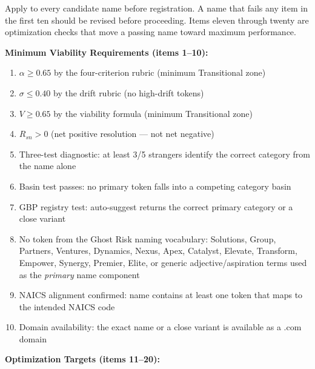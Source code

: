 \documentclass[12pt, openany]{book}
\theoremstyle{thmstyle}
\theoremstyle{defstyle}
\begin{document}
\begin{keybox}
Apply to every candidate name before registration. A name that fails any item in the first ten should be revised before proceeding. Items eleven through twenty are optimization checks that move a passing name toward maximum performance.

\vspace{6pt}
\textbf{Minimum Viability Requirements (items 1--10):}

\begin{enumerate}[leftmargin=1.5em, topsep=2pt]
  \item $\alpha \geq 0.65$ by the four-criterion rubric (minimum Transitional zone)
  \item $\sigma \leq 0.40$ by the drift rubric (no high-drift tokens)
  \item $V \geq 0.65$ by the viability formula (minimum Transitional zone)
  \item $R_{sn} > 0$ (net positive resolution --- not net negative)
  \item Three-test diagnostic: at least 3/5 strangers identify the correct category from the name alone
  \item Basin test passes: no primary token falls into a competing category basin
  \item GBP registry test: auto-suggest returns the correct primary category or a close variant
  \item No token from the Ghost Risk naming vocabulary: Solutions, Group, Partners, Ventures, Dynamics, Nexus, Apex, Catalyst, Elevate, Transform, Empower, Synergy, Premier, Elite, or generic adjective/aspiration terms used as the \textit{primary} name component
  \item NAICS alignment confirmed: name contains at least one token that maps to the intended NAICS code
  \item Domain availability: the exact name or a close variant is available as a .com domain
\end{enumerate}

\textbf{Optimization Targets (items 11--20):}


\end{keybox}
\end{document}
